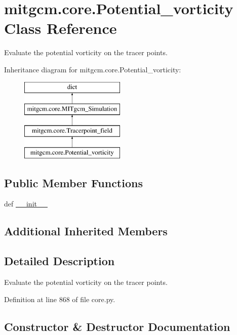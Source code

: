\hypertarget{classmitgcm_1_1core_1_1Potential__vorticity}{}\section{mitgcm.\+core.\+Potential\+\_\+vorticity Class Reference}
\label{classmitgcm_1_1core_1_1Potential__vorticity}


Evaluate the potential vorticity on the tracer points.  


Inheritance diagram for mitgcm.\+core.\+Potential\+\_\+vorticity\+:\begin{figure}[H]
\begin{center}
\leavevmode
\includegraphics[height=4.000000cm]{classmitgcm_1_1core_1_1Potential__vorticity}
\end{center}
\end{figure}
\subsection*{Public Member Functions}
\begin{DoxyCompactItemize}
\item 
def \hyperlink{classmitgcm_1_1core_1_1Potential__vorticity_aa5cd85f4c534241e18601d592c30b098}{\+\_\+\+\_\+init\+\_\+\+\_\+}
\end{DoxyCompactItemize}
\subsection*{Additional Inherited Members}


\subsection{Detailed Description}
Evaluate the potential vorticity on the tracer points. 



Definition at line 868 of file core.\+py.



\subsection{Constructor \& Destructor Documentation}
\hypertarget{classmitgcm_1_1core_1_1Potential__vorticity_aa5cd85f4c534241e18601d592c30b098}{}
